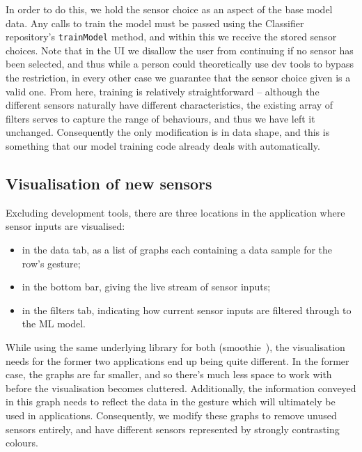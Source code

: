 \documentclass{article}
\begin{document}
In order to do this, we hold the sensor choice as an aspect of the base model data. Any calls to train the model must be passed using the Classifier repository's \verb|trainModel| method, and within this we receive the stored sensor choices. Note that in the UI we disallow the user from continuing if no sensor has been selected, and thus while a person could theoretically use dev tools to bypass the restriction, in every other case we guarantee that the sensor choice given is a valid one. From here, training is relatively straightforward -- although the different sensors naturally have different characteristics, the existing array of filters serves to capture the range of behaviours, and thus we have left it unchanged. Consequently the only modification is in data shape, and this is something that our model training code already deals with automatically.


\subsection{Visualisation of new sensors}%
\label{subsec:sensorvis}

Excluding development tools, there are three locations in the application where sensor inputs are visualised:
\begin{itemize}
  \item in the data tab, as a list of graphs each containing a data sample for the row's gesture;
  \item in the bottom bar, giving the live stream of sensor inputs;
  \item in the filters tab, indicating how current sensor inputs are filtered through to the ML model.
\end{itemize}

While using the same underlying library for both (smoothie~\cite{smoothies}), the visualisation needs for the former two applications end up being quite different. In the former case, the graphs are far smaller, and so there's much less space to work with before the visualisation becomes cluttered. Additionally, the information conveyed in this graph needs to reflect the data in the gesture which will ultimately be used in applications. Consequently, we modify these graphs to remove unused sensors entirely, and have different sensors represented by strongly contrasting colours. \\
\end{document}
